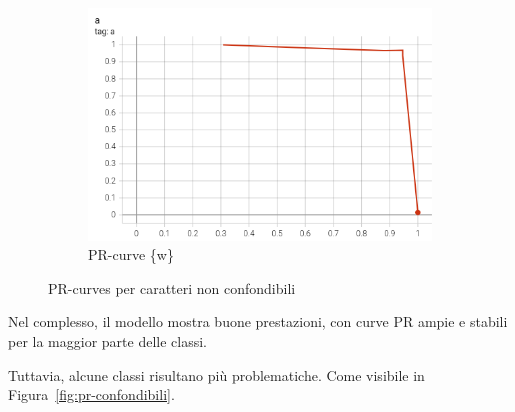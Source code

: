 \begin{figure}[htbp]
\begin{subfigure}[t]{0.32\textwidth}
        \centering
        \includegraphics[width=\textwidth]{images/pr_curve3.png}
        \caption{PR-curve \{w\}}
    \end{subfigure}
    \caption{PR-curves per caratteri non confondibili}
    \label{fig:pr_curves}
\end{figure}

Nel complesso, il modello mostra buone prestazioni, con curve PR ampie e stabili per la maggior parte delle classi.

Tuttavia, alcune classi risultano più problematiche. Come visibile in Figura~\ref{fig:pr-confondibili}.

